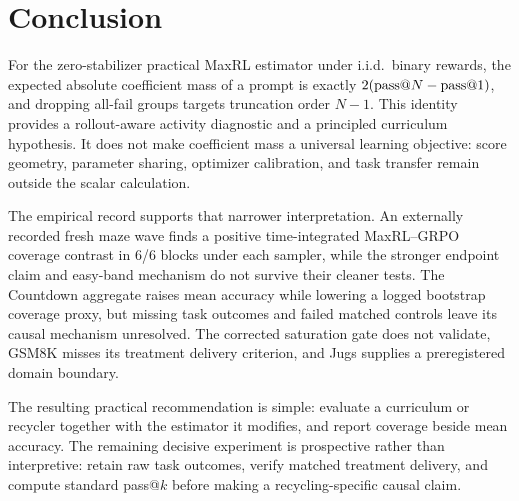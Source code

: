 \section{Conclusion}

For the zero-stabilizer practical MaxRL estimator under i.i.d.\ binary
rewards, the expected absolute coefficient mass of a prompt is exactly
$2(\text{pass@}N-\text{pass@}1)$, and dropping all-fail groups targets
truncation order $N{-}1$. This identity provides a rollout-aware
activity diagnostic and a principled curriculum hypothesis. It does
not make coefficient mass a universal learning objective: score
geometry, parameter sharing, optimizer calibration, and task transfer
remain outside the scalar calculation.

The empirical record supports that narrower interpretation. An
externally recorded fresh maze wave finds a positive time-integrated
MaxRL--GRPO coverage contrast in 6/6 blocks under each sampler, while
the stronger endpoint claim and easy-band mechanism do not survive
their cleaner tests. The Countdown aggregate raises mean accuracy while
lowering a logged bootstrap coverage proxy, but missing task outcomes
and failed matched controls leave its causal mechanism unresolved. The
corrected saturation gate does not validate, GSM8K misses its treatment
delivery criterion, and Jugs supplies a preregistered domain boundary.

The resulting practical recommendation is simple: evaluate a
curriculum or recycler together with the estimator it modifies, and
report coverage beside mean accuracy. The remaining decisive experiment
is prospective rather than interpretive: retain raw task outcomes,
verify matched treatment delivery, and compute standard pass@$k$ before
making a recycling-specific causal claim.


